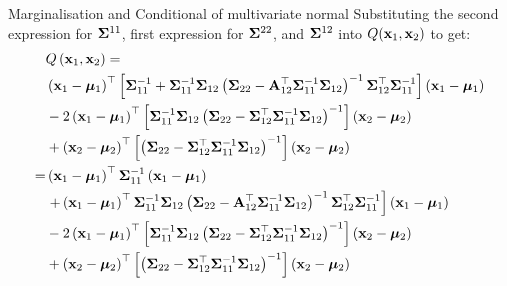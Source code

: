 \documentclass{beamer}
\begin{document}
\begin{frame}{Marginalisation and Conditional of multivariate normal}
	Substituting the second expression for $\mSigma^{11}$, first expression for $\mSigma^{22}$, and $\mSigma^{12}$ into $Q(\vx_1,\vx_2)$ to get:
	\footnotesize
	\begin{gather}
	\begin{aligned}
	&Q\left(\vx_{1}, \vx_{2}\right)= \\
    &\left(\vx_{1}-\vmu_{1}\right)\tp\left[\mSigma_{11}\inv+\mSigma_{11}\inv \mSigma_{12}\left(\mSigma_{22}-\mA_{12}\tp \mSigma_{11}\inv \mSigma_{12}\right)\inv \mSigma_{12}\tp \mSigma_{11}\inv\right]\left(\vx_{1}-\vmu_{1}\right) \\
	&-2\left(\vx_{1}-\vmu_{1}\right)\tp\left[\mSigma_{11}\inv \mSigma_{12}\left(\mSigma_{22}-\mSigma_{12}\tp \mSigma_{11}\inv \mSigma_{12}\right)\inv\right]\left(\vx_{2}-\vmu_{2}\right) \\
	&+\left(\vx_{2}-\vmu_{2}\right)\tp\left[\left(\mSigma_{22}-\mSigma_{12}\tp \mSigma_{11}\inv \mSigma_{12}\right)\inv\right]\left(\vx_{2}-\vmu_{2}\right)\\
	=&\left(\vx_{1}-\vmu_{1}\right)\tp \mSigma_{11}\inv\left(\vx_{1}-\vmu_{1}\right) \\
	&\left.+\left(\vx_{1}-\vmu_{1}\right)\tp \mSigma_{11}\inv \mSigma_{12}\left(\mSigma_{22}-\mA_{12}\tp \mSigma_{11}\inv \mSigma_{12}\right)\inv \mSigma_{12}\tp \mSigma_{11}\inv\right]\left(\vx_{1}-\vmu_{1}\right) \\
	&-2\left(\vx_{1}-\vmu_{1}\right)\tp\left[\mSigma_{11}\inv \mSigma_{12}\left(\mSigma_{22}-\mSigma_{12}\tp \mSigma_{11}\inv \mSigma_{12}\right)\inv\right]\left(\vx_{2}-\vmu_{2}\right) \\
	&+\left(\vx_{2}-\vmu_{2}\right)\tp\left[\left(\mSigma_{22}-\mSigma_{12}\tp \mSigma_{11}\inv \mSigma_{12}\right)\inv\right]\left(\vx_{2}-\vmu_{2}\right)
	\end{aligned}\\
	\end{gather}
\end{frame}
\end{document}
